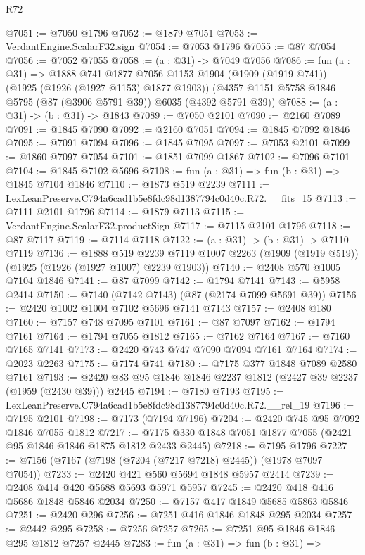 \begin{lexlean}{R72}
\begin{coremodule}
@7051 := @7050 @1796
@7052 := @1879 @7051
@7053 := VerdantEngine.ScalarF32.sign
@7054 := @7053 @1796
@7055 := @87 @7054
@7056 := @7052 @7055
@7058 := (a : @31) -> @7049 @7056
@7086 := fun (a : @31) =>
  @1888
    @741
    @1877
    @7056
    @1153
    @1904
    (@1909 (@1919 @741))
    (@1925 (@1926 (@1927 @1153) @1877 @1903))
    (@4357 @1151 @5758 @1846 @5795 (@87 (@3906 @5791 @39)) @6035 (@4392 @5791 @39))
@7088 := (a : @31) -> (b : @31) -> @1843
@7089 := @7050 @2101
@7090 := @2160 @7089
@7091 := @1845 @7090
@7092 := @2160 @7051
@7094 := @1845 @7092 @1846
@7095 := @7091 @7094
@7096 := @1845 @7095
@7097 := @7053 @2101
@7099 := @1860 @7097 @7054
@7101 := @1851 @7099 @1867
@7102 := @7096 @7101
@7104 := @1845 @7102 @5696
@7108 := fun (a : @31) => fun (b : @31) => @1845 @7104 @1846
@7110 := @1873 @519 @2239
@7111 := LexLeanPreserve.C794a6cad1b5e8fdc98d1387794c0d40c.R72.__fits_15
@7113 := @7111 @2101 @1796
@7114 := @1879 @7113
@7115 := VerdantEngine.ScalarF32.productSign
@7117 := @7115 @2101 @1796
@7118 := @87 @7117
@7119 := @7114 @7118
@7122 := (a : @31) -> (b : @31) -> @7110 @7119
@7136 := @1888
    @519
    @2239
    @7119
    @1007
    @2263
    (@1909 (@1919 @519))
    (@1925 (@1926 (@1927 @1007) @2239 @1903))
@7140 := @2408 @570 @1005 @7104 @1846
@7141 := @87 @7099
@7142 := @1794 @7141
@7143 := @5958 @2414
@7150 := @7140 (@7142 @7143) (@87 (@2174 @7099 @5691 @39))
@7156 := @2420 @1002 @1004 @7102 @5696 @7141 @7143
@7157 := @2408 @180
@7160 := @7157 @748 @7095 @7101
@7161 := @87 @7097
@7162 := @1794 @7161
@7164 := @1794 @7055 @1812
@7165 := @7162 @7164
@7167 := @7160 @7165 @7141
@7173 := @2420 @743 @747 @7090 @7094 @7161 @7164
@7174 := @2023 @2263
@7175 := @7174 @741
@7180 := @7175 @377 @1848 @7089 @2580 @7161
@7193 := @2420 @83 @95 @1846 @1846 @2237 @1812 (@2427 @39 @2237 (@1959 (@2430 @39))) @2445
@7194 := @7180 @7193
@7195 := LexLeanPreserve.C794a6cad1b5e8fdc98d1387794c0d40c.R72.__rel_19
@7196 := @7195 @2101
@7198 := @7173 (@7194 @7196)
@7204 := @2420 @745 @95 @7092 @1846 @7055 @1812
@7217 := @7175 @330 @1848 @7051 @1877 @7055 (@2421 @95 @1846 @1846 @1875 @1812 @2433 @2445)
@7218 := @7195 @1796
@7227 := @7156 (@7167 (@7198 (@7204 (@7217 @7218) @2445)) (@1978 @7097 @7054))
@7233 := @2420 @421 @560 @5694 @1848 @5957 @2414
@7239 := @2408 @414 @420 @5688 @5693 @5971 @5957
@7245 := @2420 @418 @416 @5686 @1848 @5846 @2034
@7250 := @7157 @417 @1849 @5685 @5863 @5846
@7251 := @2420 @296
@7256 := @7251 @416 @1846 @1848 @295 @2034
@7257 := @2442 @295
@7258 := @7256 @7257
@7265 := @7251 @95 @1846 @1846 @295 @1812 @7257 @2445
@7283 := fun (a : @31) =>
  fun (b : @31) =>

\end{coremodule}
\end{lexlean}
